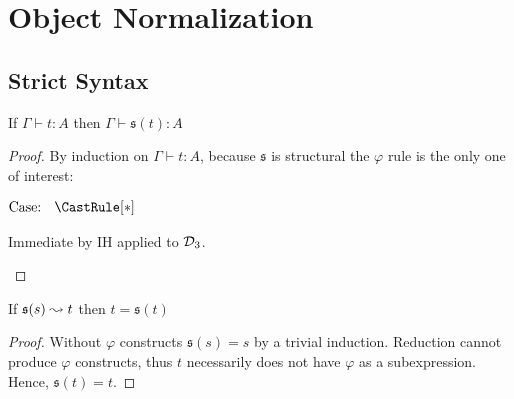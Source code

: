 \chapter{Object Normalization}

\section{Strict Syntax}





\begin{lemma}
    \label{lem:5:strict_proof}
    If $\Gamma \vdash t : A$ then $\Gamma \vdash \mathfrak{s}(t) : A$
\end{lemma}
\begin{proof}
    By induction on $\Gamma \vdash t : A$, because $\mathfrak{s}$ is structural the $\varphi$ rule is the only one of interest:

    $\text{Case: }\begin{array}{c} \CastRule[*] \end{array}$
    \begin{proofcase}
        Immediate by IH applied to $\mathcal{D}_{3}$.
    \end{proofcase}
\end{proof}

\begin{lemma}
    \label{lem:5:strict_preservation}
    If $\mathfrak{s}(s) \leadsto t$ then $t = \mathfrak{s}(t)$
\end{lemma}
\begin{proof}
    Without $\varphi$ constructs $\mathfrak{s}(s) = s$ by a trivial induction.
    Reduction cannot produce $\varphi$ constructs, thus $t$ necessarily does not have $\varphi$ as a subexpression.
    Hence, $\mathfrak{s}(t) = t$.
\end{proof}

